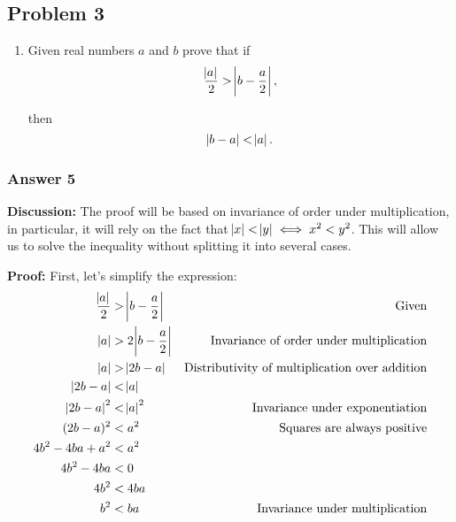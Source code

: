 \documentclass[11pt]{article}
\begin{document}
\subsection{Problem 3}
\label{sec-1-3}
\begin{enumerate}
\item Given real numbers $a$ and $b$ prove that if
\begin{equation*}
   \frac{\abs{a}}{2}>\abs{b-\frac{a}{2}},
\end{equation*}

then
\begin{equation*}
   \abs{b-a}<\abs{a}.
\end{equation*}
\end{enumerate}

\subsubsection{Answer 5}
\label{sec-1-3-1}
\textbf{Discussion:} The proof will be based on invariance of order under multiplication,
in particular, it will rely on the fact that $\abs{x} < \abs{y} \iff x^2 < y^2$.
This will allow us to solve the inequality without splitting it into several
cases.

\textbf{Proof:} First, let's simplify the expression:
\begin{equation*}
  \begin{aligned}
    \frac{\abs{a}}{2} &> \abs{b-\frac{a}{2}} 
    & \textrm{Given} \\
    \abs{a}           &> 2\abs{b-\frac{a}{2}}
    & \textrm{Invariance of order under multiplication} \\
    \abs{a}           &> \abs{2b-a}
    & \textrm{Distributivity of multiplication over addition} \\
    \abs{2b-a}        &< \abs{a} \\
    \abs{2b-a}^2      &< \abs{a}^2
    & \textrm{Invariance under exponentiation} \\
    (2b-a)^2          &< a^2
    & \textrm{Squares are always positive} \\
    4b^2 - 4ba + a^2  &< a^2 \\
    4b^2 - 4ba        &< 0 \\
    4b^2              &< 4ba \\
    b^2               &< ba
    & \textrm{Invariance under multiplication}
  \end{aligned}
\end{equation*}
\end{document}
